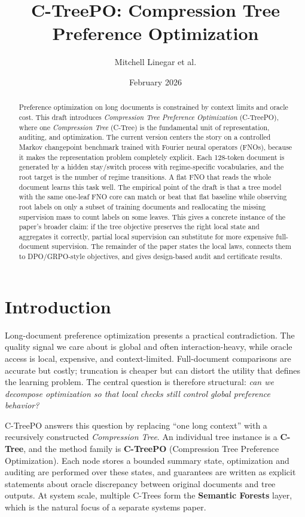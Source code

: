 \documentclass[11pt]{article}
\title{C-TreePO: Compression Tree Preference Optimization}
\author{Mitchell Linegar et al.}
\date{February 2026}
\begin{document}
\maketitle

\begin{abstract}
Preference optimization on long documents is constrained by context limits and oracle cost.
This draft introduces \emph{Compression Tree Preference Optimization} (C-TreePO), where one \emph{Compression Tree} (C-Tree) is the fundamental unit of representation, auditing, and optimization.
The current version centers the story on a controlled Markov changepoint benchmark trained with Fourier neural operators (FNOs), because it makes the representation problem completely explicit.
Each 128-token document is generated by a hidden stay/switch process with regime-specific vocabularies, and the root target is the number of regime transitions.
A flat FNO that reads the whole document learns this task well.
The empirical point of the draft is that a tree model with the same one-leaf FNO core can match or beat that flat baseline while observing root labels on only a subset of training documents and reallocating the missing supervision mass to count labels on some leaves.
This gives a concrete instance of the paper's broader claim: if the tree objective preserves the right local state and aggregates it correctly, partial local supervision can substitute for more expensive full-document supervision.
The remainder of the paper states the local laws, connects them to DPO/GRPO-style objectives, and gives design-based audit and certificate results.
\end{abstract}

\section{Introduction}\label{sec:introduction}

Long-document preference optimization presents a practical contradiction. The quality signal we care about is global and often interaction-heavy, while oracle access is local, expensive, and context-limited. Full-document comparisons are accurate but costly; truncation is cheaper but can distort the utility that defines the learning problem. The central question is therefore structural: \emph{can we decompose optimization so that local checks still control global preference behavior?}

C-TreePO answers this question by replacing ``one long context'' with a recursively constructed \emph{Compression Tree}. An individual tree instance is a \textbf{C-Tree}, and the method family is \textbf{C-TreePO} (Compression Tree Preference Optimization). Each node stores a bounded summary state, optimization and auditing are performed over these states, and guarantees are written as explicit statements about oracle discrepancy between original documents and tree outputs. At system scale, multiple C-Trees form the \textbf{Semantic Forests} layer, which is the natural focus of a separate systems paper.
\end{document}
